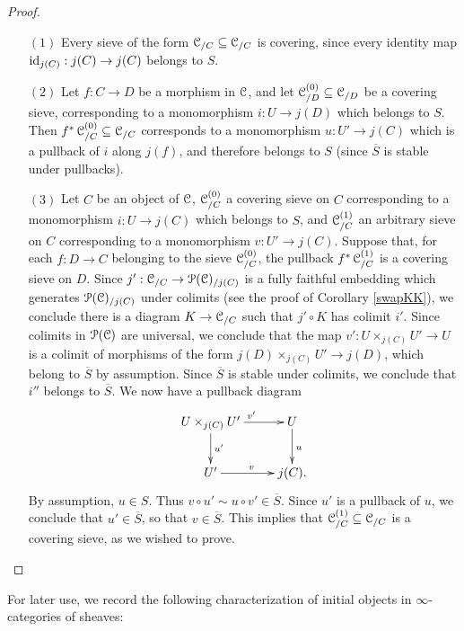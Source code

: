 \begin{proof}
\begin{itemize}
\item[$(1)$] Every sieve of the form $\operatorname{\mathcal{C}}_{/C} \subseteq \operatorname{\mathcal{C}}_{/C}$ is covering, since every identity map $\operatorname{id}_{j(C)}: j(C) \rightarrow j(C)$ belongs to $S$.
\item[$(2)$] Let $f: C \rightarrow D$ be a morphism in $\operatorname{\mathcal{C}}$, and let
$\operatorname{\mathcal{C}}^{(0)}_{/D} \subseteq \operatorname{\mathcal{C}}_{/D}$ be a covering sieve, corresponding to a monomorphism
$i: U \rightarrow j(D)$ which belongs to $S$. Then $f^{\ast} \operatorname{\mathcal{C}}^{(0)}_{/C} \subseteq \operatorname{\mathcal{C}}_{/C}$
corresponds to a monomorphism $u: U' \rightarrow j(C)$ which is a pullback of $i$ along
$j(f)$, and therefore belongs to $S$ (since $\overline{S}$ is stable under pullbacks).
\item[$(3)$] Let $C$ be an object of $\operatorname{\mathcal{C}}$, $\operatorname{\mathcal{C}}^{(0)}_{/C}$ a covering sieve on $C$ corresponding to a monomorphism $i: U \rightarrow j(C)$ which belongs to $S$, 
and $\operatorname{\mathcal{C}}^{(1)}_{/C}$ an arbitrary sieve on $C$ corresponding to a monomorphism
$v: U' \rightarrow j(C)$. Suppose that, for each $f: D \rightarrow C$ belonging to the sieve $\operatorname{\mathcal{C}}^{(0)}_{/C}$, the pullback $f^{\ast} \operatorname{\mathcal{C}}^{(1)}_{/C}$ is a covering sieve on $D$.
Since $j': \operatorname{\mathcal{C}}_{/C} \rightarrow \operatorname{\mathcal{P}}(\operatorname{\mathcal{C}})_{/j(C)}$ is a fully faithful embedding which generates $\operatorname{\mathcal{P}}(\operatorname{\mathcal{C}})_{/j(C)}$ under colimits (see the proof of Corollary \ref{swapKK}), we conclude
there is a diagram $K \rightarrow \operatorname{\mathcal{C}}_{/C}$ such that $j' \circ K$ has colimit $i'$.
Since colimits in $\operatorname{\mathcal{P}}(\operatorname{\mathcal{C}})$ are universal, we conclude that the map
$v': U \times_{j(C)} U' \rightarrow U$ is a colimit of morphisms of the form
$j(D) \times_{j(C)} U' \rightarrow j(D)$, which belong to $\overline{S}$ by assumption.
Since $\overline{S}$ is stable under colimits, we conclude that $i''$ belongs to $\overline{S}$.
We now have a pullback diagram
$$ \xymatrix{ U \times_{j(C)} U' \ar[r]^{v'} \ar[d]^{u'} & U \ar[d]^{u} \\
U' \ar[r]^{v} & j(C). }$$
By assumption, $u \in S$. 
Thus $v \circ u' \sim u \circ v' \in \overline{S}$. Since $u'$ is a pullback of
$u$, we conclude that $u' \in \overline{S}$, so that $v \in \overline{S}$.
This implies that $\operatorname{\mathcal{C}}^{(1)}_{/C} \subseteq \operatorname{\mathcal{C}}_{/C}$ is a covering sieve, as we wished to prove.
\end{itemize}
\end{proof}

For later use, we record the following characterization of initial objects in $\infty$-categories of sheaves:

